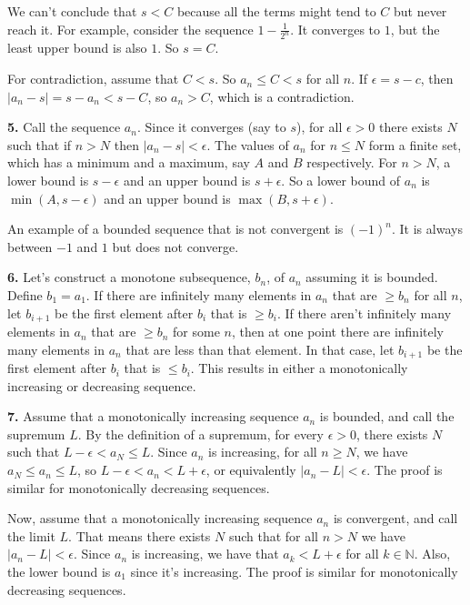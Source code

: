 \documentclass{article}
\begin{document}
We can't conclude that $s < C$ because all the terms might tend to $C$ but never reach it. For example, consider the sequence $1 - \frac{1}{2^n}$. It converges to $1$, but the least upper bound is also $1$. So $s = C$.
\newline

For contradiction, assume that $C < s$. So $a_n \le C < s$ for all $n$. If $\epsilon = s - c$, then $|a_n - s| = s - a_n < s - C$, so $a_n > C$, which is a contradiction.
\newline

\textbf{5.} Call the sequence $a_n$. Since it converges (say to $s$), for all $\epsilon > 0$ there exists $N$ such that if $n > N$ then $|a_n - s| < \epsilon$. The values of $a_n$ for $n \le N$ form a finite set, which has a minimum and a maximum, say $A$ and $B$ respectively. For $n > N$, a lower bound is $s - \epsilon$ and an upper bound is $s + \epsilon$. So a lower bound of $a_n$ is $\min(A, s - \epsilon)$ and an upper bound is $\max(B, s + \epsilon)$.
\newline

An example of a bounded sequence that is not convergent is $(-1)^n$. It is always between $-1$ and $1$ but does not converge.
\newline

\textbf{6.} Let's construct a monotone subsequence, $b_n$, of $a_n$ assuming it is bounded. Define $b_1 = a_1$. If there are infinitely many elements in $a_n$ that are $\ge b_n$ for all $n$, let $b_{i + 1}$ be the first element after $b_i$ that is $\ge b_i$. If there aren't infinitely many elements in $a_n$ that are $\ge b_n$ for some $n$, then at one point there are infinitely many elements in $a_n$ that are less than that element. In that case, let $b_{i + 1}$ be the first element after $b_i$ that is $\le b_i$. This results in either a monotonically increasing or decreasing sequence.
\newline

\textbf{7.} Assume that a monotonically increasing sequence $a_n$ is bounded, and call the supremum $L$. By the definition of a supremum, for every $\epsilon > 0$, there exists $N$ such that $L - \epsilon < a_N \le L$. Since $a_n$ is increasing, for all $n \ge N$, we have $a_N \le a_n \le L$, so $L - \epsilon < a_n < L + \epsilon$, or equivalently $|a_n - L| < \epsilon$. The proof is similar for monotonically decreasing sequences.
\newline

Now, assume that a monotonically increasing sequence $a_n$ is convergent, and call the limit $L$. That means there exists $N$ such that for all $n > N$ we have $|a_n - L| < \epsilon$. Since $a_n$ is increasing, we have that $a_k < L + \epsilon$ for all $k \in \mathbb{N}$. Also, the lower bound is $a_1$ since it's increasing. The proof is similar for monotonically decreasing sequences.
\end{document}
